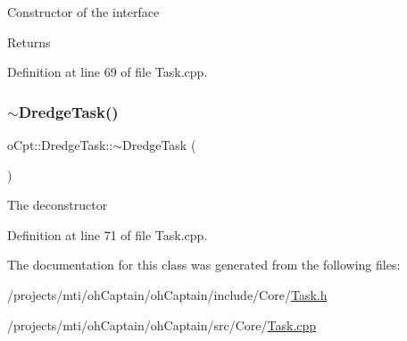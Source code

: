 Constructor of the interface \begin{DoxyReturn}{Returns}

\end{DoxyReturn}


Definition at line 69 of file Task.\+cpp.

\hypertarget{classo_cpt_1_1_dredge_task_aa326cf6ddbb6e3019fb86f8d714bf323}{}\label{classo_cpt_1_1_dredge_task_aa326cf6ddbb6e3019fb86f8d714bf323} 
\subsubsection{\texorpdfstring{$\sim$\+Dredge\+Task()}{~DredgeTask()}}
{\footnotesize\ttfamily o\+Cpt\+::\+Dredge\+Task\+::$\sim$\+Dredge\+Task (\begin{DoxyParamCaption}{ }\end{DoxyParamCaption})\hspace{0.3cm}{\ttfamily [virtual]}}

The deconstructor 

Definition at line 71 of file Task.\+cpp.



The documentation for this class was generated from the following files\+:\begin{DoxyCompactItemize}
\item 
/projects/mti/oh\+Captain/oh\+Captain/include/\+Core/\hyperlink{_task_8h}{Task.\+h}\item 
/projects/mti/oh\+Captain/oh\+Captain/src/\+Core/\hyperlink{_task_8cpp}{Task.\+cpp}\end{DoxyCompactItemize}
